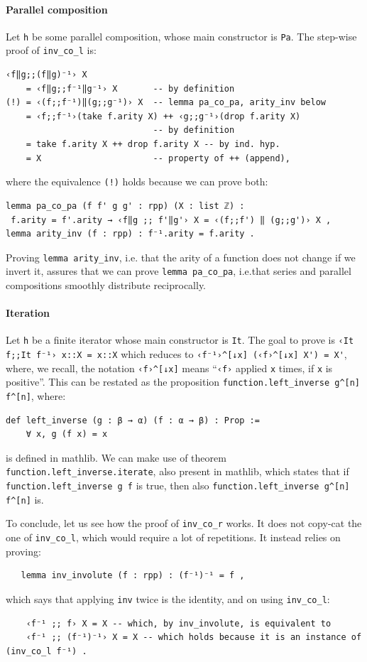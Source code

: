 \documentclass[preprint]{elsarticle}
\theoremstyle{remark}
\newcommand{\MATHLIB}{\textsf{mathlib}\xspace}
\begin{document}
\paragraph{Parallel composition} Let \lstinline|h| be some parallel composition, whose main constructor is \lstinline|Pa|. The step-wise proof of \lstinline|inv_co_l| is:
\begin{lstlisting}
‹f‖g;;(f‖g)⁻¹› X
    = ‹f‖g;;f⁻¹‖g⁻¹› X       -- by definition
(!) = ‹(f;;f⁻¹)‖(g;;g⁻¹)› X  -- lemma pa_co_pa, arity_inv below
    = ‹f;;f⁻¹›(take f.arity X) ++ ‹g;;g⁻¹›(drop f.arity X)
                             -- by definition
    = take f.arity X ++ drop f.arity X -- by ind. hyp.
    = X                      -- property of ++ (append),
\end{lstlisting}
where the equivalence \lstinline|(!)| holds because we can prove both:
\begin{lstlisting}
lemma pa_co_pa (f f' g g' : rpp) (X : list ℤ) :
 f.arity = f'.arity → ‹f‖g ;; f'‖g'› X = ‹(f;;f') ‖ (g;;g')› X ,
lemma arity_inv (f : rpp) : f⁻¹.arity = f.arity .
\end{lstlisting}
Proving \lstinline|lemma arity_inv|, i.e. that the arity of a function does not change if we invert it, assures that we can prove \lstinline|lemma pa_co_pa|, i.e.\@ that series and parallel compositions smoothly distribute reciprocally.

\paragraph{Iteration} Let \lstinline|h| be a finite iterator whose main constructor is \lstinline|It|.
The goal to prove is \lstinline|‹It f;;It f⁻¹› x::X = x::X| which reduces to \lstinline|‹f⁻¹›^[↓x] (‹f›^[↓x] X') = X'|, where, we recall, the notation \lstinline|‹f›^[↓x]| means ``\lstinline|‹f›| applied \lstinline|x| times, if \lstinline|x| is positive''. This can be restated as the proposition \lstinline|function.left_inverse g^[n] f^[n]|, where:
\begin{lstlisting}
def left_inverse (g : β → α) (f : α → β) : Prop :=
    ∀ x, g (f x) = x
\end{lstlisting}
is defined in \MATHLIB. We can make use of theorem \lstinline{function.left_inverse.iterate}, also present in \MATHLIB, which states that if \lstinline{function.left_inverse g f} is true, then also \lstinline|function.left_inverse g^[n] f^[n]| is.

\vspace{\baselineskip}
To conclude, let us see how the proof of \lstinline|inv_co_r| works. It does not copy-cat the one of \lstinline|inv_co_l|, which would require a lot of repetitions. It instead relies on proving:
\begin{lstlisting}
   lemma inv_involute (f : rpp) : (f⁻¹)⁻¹ = f ,
\end{lstlisting}
\noindent
which says that applying \lstinline|inv| twice is the identity, and on using \lstinline|inv_co_l|:
\begin{lstlisting}
    ‹f⁻¹ ;; f› X = X -- which, by inv_involute, is equivalent to
    ‹f⁻¹ ;; (f⁻¹)⁻¹› X = X -- which holds because it is an instance of (inv_co_l f⁻¹) .
\end{lstlisting}
\end{document}
